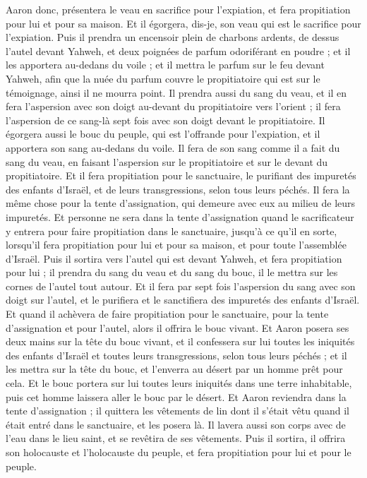\begin{multicols}{2}
Aaron donc, présentera le veau en sacrifice pour l'expiation, et fera propitiation pour lui et pour sa maison. Et il égorgera, dis-je, son veau qui est le sacrifice pour l'expiation.
Puis il prendra un encensoir plein de charbons ardents, de dessus l'autel devant Yahweh, et deux poignées de parfum odoriférant en poudre ; et il les apportera au-dedans du voile ;
et il mettra le parfum sur le feu devant Yahweh, afin que la nuée du parfum couvre le propitiatoire qui est sur le témoignage, ainsi il ne mourra point.
Il prendra aussi du sang du veau, et il en fera l'aspersion avec son doigt au-devant du propitiatoire vers l'orient ; il fera l'aspersion de ce sang-là sept fois avec son doigt devant le propitiatoire.
Il égorgera aussi le bouc du peuple, qui est l'offrande pour l'expiation, et il apportera son sang au-dedans du voile. Il fera de son sang comme il a fait du sang du veau, en faisant l'aspersion sur le propitiatoire et sur le devant du propitiatoire.
Et il fera propitiation pour le sanctuaire, le purifiant des impuretés des enfants d'Israël, et de leurs transgressions, selon tous leurs péchés. Il fera la même chose pour la tente d'assignation, qui demeure avec eux au milieu de leurs impuretés.
Et personne ne sera dans la tente d'assignation quand le sacrificateur y entrera pour faire propitiation dans le sanctuaire, jusqu'à ce qu'il en sorte, lorsqu'il fera propitiation pour lui et pour sa maison, et pour toute l'assemblée d'Israël.
Puis il sortira vers l'autel qui est devant Yahweh, et fera propitiation pour lui ; il prendra du sang du veau et du sang du bouc, il le mettra sur les cornes de l'autel tout autour.
Et il fera par sept fois l'aspersion du sang avec son doigt sur l'autel, et le purifiera et le sanctifiera des impuretés des enfants d'Israël.
Et quand il achèvera de faire propitiation pour le sanctuaire, pour la tente d'assignation et pour l'autel, alors il offrira le bouc vivant.
Et Aaron posera ses deux mains sur la tête du bouc vivant, et il confessera sur lui toutes les iniquités des enfants d'Israël et toutes leurs transgressions, selon tous leurs péchés ; et il les mettra sur la tête du bouc, et l'enverra au désert par un homme prêt pour cela.
Et le bouc portera sur lui toutes leurs iniquités dans une terre inhabitable, puis cet homme laissera aller le bouc par le désert.
Et Aaron reviendra dans la tente d'assignation ; il quittera les vêtements de lin dont il s'était vêtu quand il était entré dans le sanctuaire, et les posera là.
Il lavera aussi son corps avec de l'eau dans le lieu saint, et se revêtira de ses vêtements. Puis il sortira, il offrira son holocauste et l'holocauste du peuple, et fera propitiation pour lui et pour le peuple.

\end{multicols}

